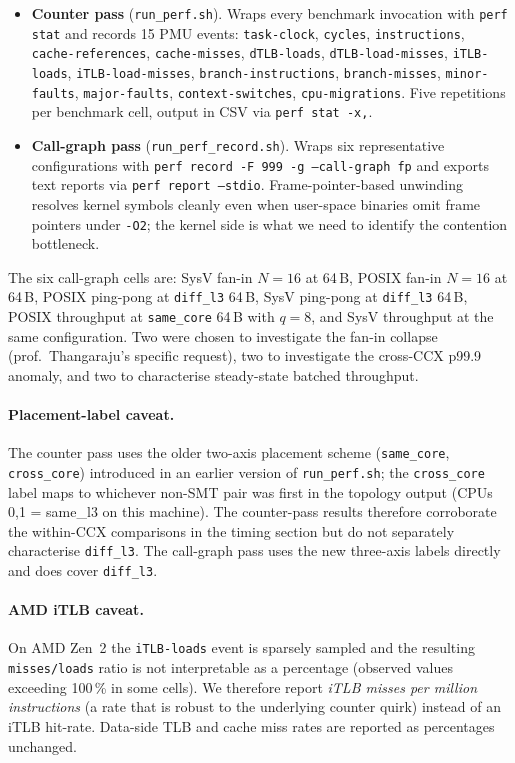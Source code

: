 \documentclass[a4paper,11pt]{article}
\begin{document}
\begin{itemize}[leftmargin=*]
\item \textbf{Counter pass} (\texttt{run\_perf.sh}). Wraps every
benchmark invocation with \texttt{perf stat} and records 15 PMU events:
\texttt{task-clock}, \texttt{cycles}, \texttt{instructions},
\texttt{cache-references}, \texttt{cache-misses}, \texttt{dTLB-loads},
\texttt{dTLB-load-misses}, \texttt{iTLB-loads},
\texttt{iTLB-load-misses}, \texttt{branch-instructions},
\texttt{branch-misses}, \texttt{minor-faults}, \texttt{major-faults},
\texttt{context-switches}, \texttt{cpu-migrations}. Five repetitions
per benchmark cell, output in CSV via \texttt{perf stat -x,}.
\item \textbf{Call-graph pass} (\texttt{run\_perf\_record.sh}).
Wraps six representative configurations with
\texttt{perf record -F 999 -g --call-graph fp} and exports text reports
via \texttt{perf report --stdio}. Frame-pointer-based unwinding
resolves kernel symbols cleanly even when user-space binaries omit
frame pointers under \texttt{-O2}; the kernel side is what we need to
identify the contention bottleneck.
\end{itemize}

The six call-graph cells are: SysV fan-in $N=16$ at 64\,B, POSIX
fan-in $N=16$ at 64\,B, POSIX ping-pong at \texttt{diff\_l3} 64\,B,
SysV ping-pong at \texttt{diff\_l3} 64\,B, POSIX throughput at
\texttt{same\_core} 64\,B with $q=8$, and SysV throughput at the same
configuration. Two were chosen to investigate the fan-in collapse
(prof.\ Thangaraju's specific request), two to investigate the
cross-CCX p99.9 anomaly, and two to characterise steady-state batched
throughput.

\paragraph{Placement-label caveat.} The counter pass uses the older
two-axis placement scheme (\texttt{same\_core}, \texttt{cross\_core})
introduced in an earlier version of \texttt{run\_perf.sh}; the
\texttt{cross\_core} label maps to whichever non-SMT pair was first in
the topology output (CPUs 0,1 = same\_l3 on this machine). The
counter-pass results therefore corroborate the within-CCX comparisons
in the timing section but do not separately characterise
\texttt{diff\_l3}. The call-graph pass uses the new three-axis
labels directly and does cover \texttt{diff\_l3}.

\paragraph{AMD iTLB caveat.} On AMD Zen~2 the
\texttt{iTLB-loads} event is sparsely sampled and the resulting
\texttt{misses/loads} ratio is not interpretable as a percentage
(observed values exceeding 100\,\% in some cells). We therefore
report \emph{iTLB misses per million instructions} (a rate that is
robust to the underlying counter quirk) instead of an iTLB hit-rate.
Data-side TLB and cache miss rates are reported as percentages
unchanged.
\end{document}
